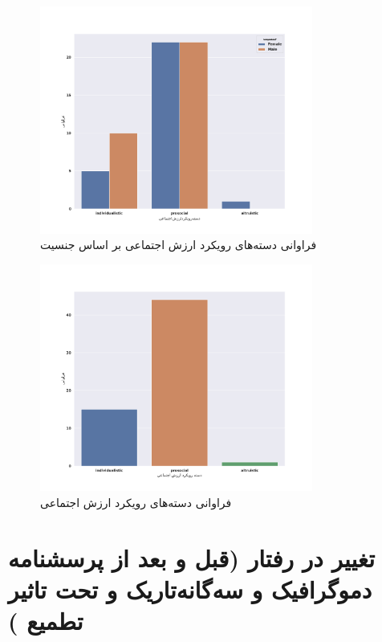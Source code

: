 \begin{figure}[htpb]
    \centering
    \includegraphics[width=0.8\textwidth]{./img/SVOAgainstPopulationSexBarPlot.png}
    \caption{فراوانی دسته‌های رویکرد ارزش اجتماعی بر اساس جنسیت}
    \label{fig:SVOAgainstPopulationSexBarPlot}
\end{figure}
\begin{figure}[htpb]
    \centering
    \includegraphics[width=0.8\textwidth]{./img/SVOAgainstPopulationBarPlot.pdf}
    \caption{فراوانی دسته‌های رویکرد ارزش اجتماعی}
    \label{fig:SVOAgainstPopulationBarPlot}
\end{figure}
\section{تغییر در رفتار
\!(قبل و بعد از پرسشنامه دموگرافیک و سه‌گانه‌تاریک و تحت تاثیر تطمیع 
)}

